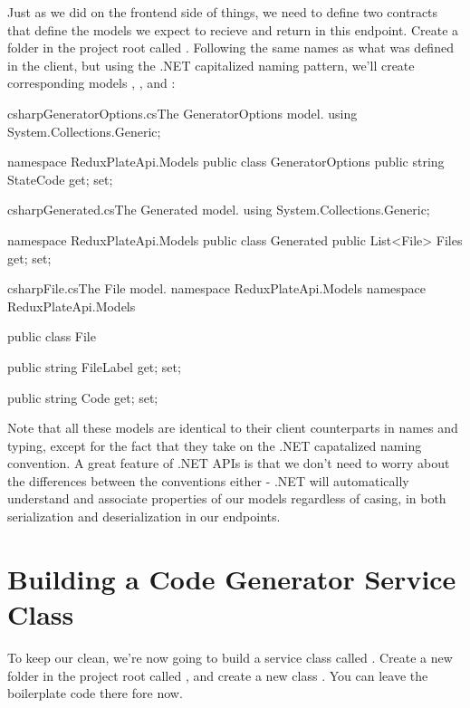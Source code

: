 \documentclass[a4paper,headinclude=on,footinclude=on,12pt,oneside]{scrbook}
\begin{document}
Just as we did on the frontend side of things, we need to define two contracts that define the models we expect to recieve and return in this endpoint. Create a folder in the project root called . Following the same names as what was defined in the client, but using the .NET capitalized naming pattern, we'll create corresponding models , , and :

\begin{codeInput}{csharp}{GeneratorOptions.cs}{The GeneratorOptions model.}
using System.Collections.Generic;

namespace ReduxPlateApi.Models
{
    public class GeneratorOptions
    {
        public string StateCode { get; set; }
    }
}  
\end{codeInput}

\begin{codeInput}{csharp}{Generated.cs}{The Generated model.}
using System.Collections.Generic;

namespace ReduxPlateApi.Models
{
    public class Generated
    {
        public List<File> Files { get; set; }
    }
}  
\end{codeInput}

\begin{codeInput}{csharp}{File.cs}{The File model.}
namespace ReduxPlateApi.Models
namespace ReduxPlateApi.Models
{
    public class File
    {
        public string FileLabel { get; set; }

        public string Code { get; set; }
    }
}
\end{codeInput}

Note that all these models are identical to their client counterparts in names and typing, except for the fact that they take on the .NET capatalized naming convention. A great feature of .NET APIs is that we don't need to worry about the differences between the conventions either - .NET will automatically understand and associate properties of our models regardless of casing, in both serialization and deserialization in our endpoints.

\section{Building a Code Generator Service Class}

To keep our  clean, we're now going to build a service class called . Create a new folder in the project root called , and create a new class . You can leave the boilerplate code there fore now.
\end{document}
